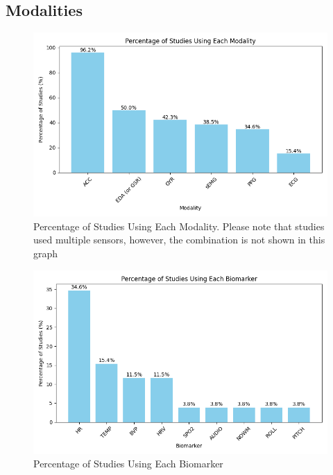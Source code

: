 \subsection{Modalities}

\begin{figure}
    \centering
    \includegraphics[width=1\textwidth]{Results/figures/percentage_of_studies_using_each_modality.png}
    \caption{Percentage of Studies Using Each Modality. Please note that studies used multiple sensors, however, the combination is not shown in this graph}
    \label{fig:percentage_of_studies_using_each_modality}
\end{figure}

\begin{figure}
    \centering
    \includegraphics[width=1\textwidth]{Results/figures/percentage_of_studies_using_each_biomarker.png}
    \caption{Percentage of Studies Using Each Biomarker}
    \label{fig:percentage_of_studies_using_each_biomarker}
\end{figure}

